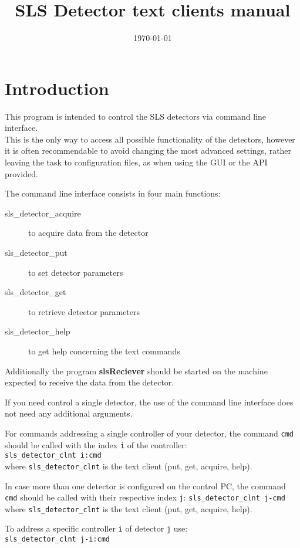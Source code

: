 \documentclass{article}
\begin{document}
\title{SLS Detector text clients manual}
\date{\today}
\maketitle



\section{Introduction}

This program is intended to control the SLS detectors via command line interface.\\
This is the only way to access all possible functionality of the detectors, however it is often recommendable to avoid changing the most advanced settings, rather leaving the task to configuration files, as when using the GUI or the API provided.

The command line interface consists in four main functions:
\begin{description}
\item[sls\_detector\_acquire] to acquire data from the detector
\item[sls\_detector\_put] to set detector parameters
\item[sls\_detector\_get] to retrieve detector parameters
\item[sls\_detector\_help] to get help concerning the text commands
\end{description}
Additionally the program \textbf{slsReciever} should be started on the machine expected to receive the data from the detector.


If you need control a single detector, the use of the command line interface does not need any additional arguments.

For commands addressing a single controller of your detector, the command  \verb=cmd= should be called with the index \verb=i= of the controller:\\
\verb=sls_detector_clnt i:cmd=\\
where \verb=sls_detector_clnt= is the text client (put, get, acquire, help).

In case more than one detector is configured on the control PC, the command  \verb=cmd= should be called with their respective index  \verb=j=:
\verb=sls_detector_clnt j-cmd=\\
where \verb=sls_detector_clnt= is the text client (put, get, acquire, help).

To address a specific controller \verb=i= of detector \verb=j= use:\\
\verb=sls_detector_clnt j-i:cmd=
\end{document}
